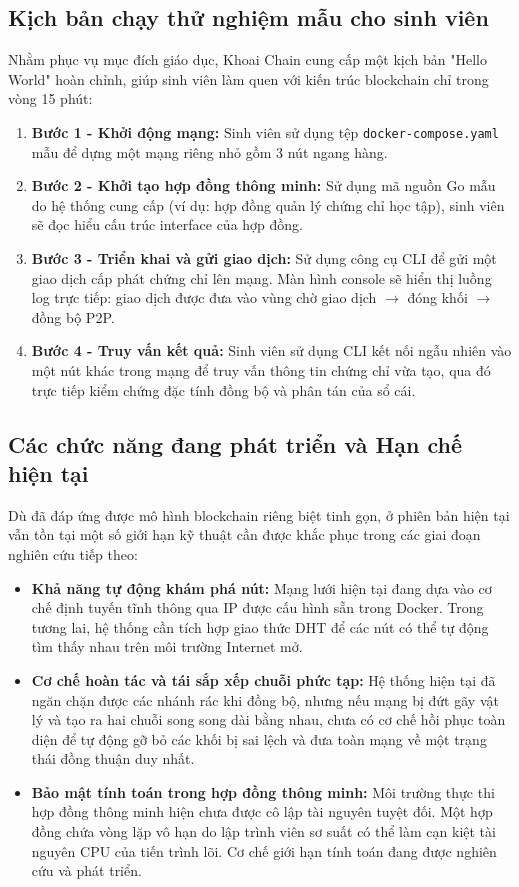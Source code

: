 \documentclass[12pt,a4paper]{article}
\begin{document}
\subsection{Kịch bản chạy thử nghiệm mẫu cho sinh viên}
Nhằm phục vụ mục đích giáo dục, Khoai Chain cung cấp một kịch bản "Hello World" hoàn chỉnh, giúp sinh viên làm quen với kiến trúc blockchain chỉ trong vòng 15 phút:
\begin{enumerate}
    \item \textbf{Bước 1 - Khởi động mạng:} Sinh viên sử dụng tệp \texttt{docker-compose.yaml} mẫu để dựng một mạng riêng nhỏ gồm 3 nút ngang hàng.
    \item \textbf{Bước 2 - Khởi tạo hợp đồng thông minh:} Sử dụng mã nguồn Go mẫu do hệ thống cung cấp (ví dụ: hợp đồng quản lý chứng chỉ học tập), sinh viên sẽ đọc hiểu cấu trúc interface của hợp đồng.
    \item \textbf{Bước 3 - Triển khai và gửi giao dịch:} Sử dụng công cụ CLI để gửi một giao dịch cấp phát chứng chỉ lên mạng. Màn hình console sẽ hiển thị luồng log trực tiếp: giao dịch được đưa vào vùng chờ giao dịch $\rightarrow$ đóng khối $\rightarrow$ đồng bộ P2P.
    \item \textbf{Bước 4 - Truy vấn kết quả:} Sinh viên sử dụng CLI kết nối ngẫu nhiên vào một nút khác trong mạng để truy vấn thông tin chứng chỉ vừa tạo, qua đó trực tiếp kiểm chứng đặc tính đồng bộ và phân tán của sổ cái.
\end{enumerate}

\subsection{Các chức năng đang phát triển và Hạn chế hiện tại}
Dù đã đáp ứng được mô hình blockchain riêng biệt tinh gọn, ở phiên bản hiện tại vẫn tồn tại một số giới hạn kỹ thuật cần được khắc phục trong các giai đoạn nghiên cứu tiếp theo:
\begin{itemize}
    \item \textbf{Khả năng tự động khám phá nút:} Mạng lưới hiện tại đang dựa vào cơ chế định tuyến tĩnh thông qua IP được cấu hình sẵn trong Docker. Trong tương lai, hệ thống cần tích hợp giao thức DHT để các nút có thể tự động tìm thấy nhau trên môi trường Internet mở.
    \item \textbf{Cơ chế hoàn tác và tái sắp xếp chuỗi phức tạp:} Hệ thống hiện tại đã ngăn chặn được các nhánh rác khi đồng bộ, nhưng nếu mạng bị đứt gãy vật lý và tạo ra hai chuỗi song song dài bằng nhau, chưa có cơ chế hồi phục toàn diện để tự động gỡ bỏ các khối bị sai lệch và đưa toàn mạng về một trạng thái đồng thuận duy nhất.
    \item \textbf{Bảo mật tính toán trong hợp đồng thông minh:} Môi trường thực thi hợp đồng thông minh hiện chưa được cô lập tài nguyên tuyệt đối. Một hợp đồng chứa vòng lặp vô hạn do lập trình viên sơ suất có thể làm cạn kiệt tài nguyên CPU của tiến trình lõi. Cơ chế giới hạn tính toán đang được nghiên cứu và phát triển.
\end{itemize}
\newpage
\end{document}

